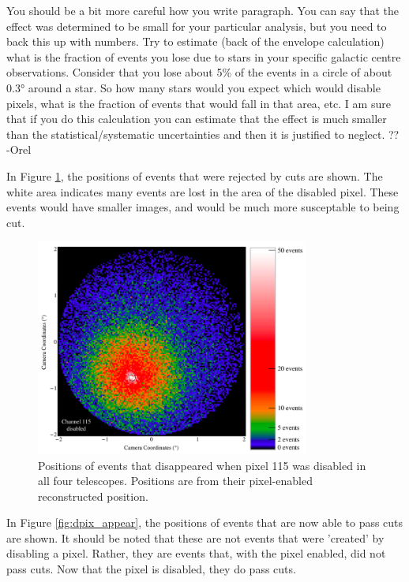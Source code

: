     {\color{red}You should be a bit more careful how you write paragraph. You can say that the effect was determined to be small for your particular analysis, but you need to back this up with numbers. 
Try to estimate (back of the envelope calculation) what is the fraction of events you lose due to stars in your specific galactic centre observations. Consider that you lose about 5\% of the events in a circle of about \ang{0.3} around a star. So how many stars would you expect which would disable pixels, what is the fraction of events that would fall in that area, etc. 
I am sure that if you do this calculation you can estimate that the effect is much smaller than the statistical/systematic uncertainties and then it is justified to neglect. ?? -Orel}

    In Figure \ref{fig:dpix_disappear}, the positions of events that were rejected by cuts are shown.
    The white area indicates many events are lost in the area of the disabled pixel.
    These events would have smaller images, and would be much more susceptable to being cut.

    \begin{figure}[ht]
      \centering
      \includegraphics[width=0.8\textwidth]{images/disabled_pixel/disappearing_events}
      \caption[Disappearing Events]{
        Positions of events that disappeared when pixel 115 was disabled in all four telescopes.
        Positions are from their pixel-enabled reconstructed position.
      }
      \label{fig:dpix_disappear}
    \end{figure}

    In Figure \ref{fig:dpix_appear}, the positions of events that are now able to pass cuts are shown.
    It should be noted that these are not events that were 'created' by disabling a pixel.
    Rather, they are events that, with the pixel enabled, did not pass cuts.
    Now that the pixel is disabled, they do pass cuts.

